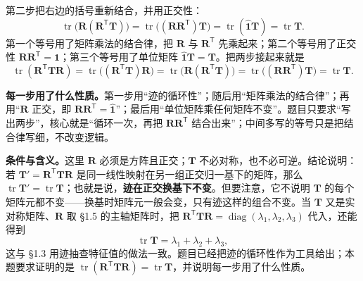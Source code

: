 \documentclass[11pt]{ctexart}
\newcommand{\ten}[1]{\mathbf{#1}}
\newcommand{\unitd}{\hat{\ten{1}}}
\newcommand{\tr}{\operatorname{tr}}
\begin{document}
第二步把右边的括号重新结合，并用正交性：
\[
\tr\bigl(\ten R(\ten R^{\mathsf T}\ten T)\bigr)
=\tr\bigl((\ten R\ten R^{\mathsf T})\ten T\bigr)
=\tr(\unitd\ten T)
=\tr\ten T .
\]
第一个等号用了矩阵乘法的结合律，把 $\ten R$ 与 $\ten R^{\mathsf T}$ 先乘起来；第二个等号用了正交性 $\ten R\ten R^{\mathsf T}=\unitd$；第三个等号用了单位矩阵 $\unitd\ten T=\ten T$。把两步接起来就是
\[
\tr(\ten R^{\mathsf T}\ten T\ten R)
=\tr\bigl((\ten R^{\mathsf T}\ten T)\ten R\bigr)
=\tr\bigl(\ten R(\ten R^{\mathsf T}\ten T)\bigr)
=\tr\bigl((\ten R\ten R^{\mathsf T})\ten T\bigr)
=\tr\ten T .
\]

\textbf{每一步用了什么性质。}第一步用“迹的循环性”；随后用“矩阵乘法的结合律”；再用“$\ten R$ 正交，即 $\ten R\ten R^{\mathsf T}=\unitd$”；最后用“单位矩阵乘任何矩阵不变”。题目只要求“写出两步”，核心就是“循环一次，再把 $\ten R\ten R^{\mathsf T}$ 结合出来”；中间多写的等号只是把结合律写细，不改变逻辑。

\textbf{条件与含义。}这里 $\ten R$ 必须是方阵且正交；$\ten T$ 不必对称，也不必可逆。结论说明：若 $\ten T'=\ten R^{\mathsf T}\ten T\ten R$ 是同一线性映射在另一组正交归一基下的矩阵，那么 $\tr\ten T'=\tr\ten T$；也就是说，\textbf{迹在正交换基下不变}。但要注意，它不说明 $\ten T$ 的每个矩阵元都不变——换基时矩阵元一般会变，只有迹这样的组合不变。当 $\ten T$ 又是实对称矩阵、$\ten R$ 取 §1.5 的主轴矩阵时，把 $\ten R^{\mathsf T}\ten T\ten R=\operatorname{diag}(\lambda_1,\lambda_2,\lambda_3)$ 代入，还能得到
\[
\tr\ten T=\lambda_1+\lambda_2+\lambda_3,
\]
这与 §1.3 用迹抽查特征值的做法一致。题目已经把迹的循环性作为工具给出；本题要求证明的是 $\tr(\ten R^{\mathsf T}\ten T\ten R)=\tr\ten T$，并说明每一步用了什么性质。
\end{document}
